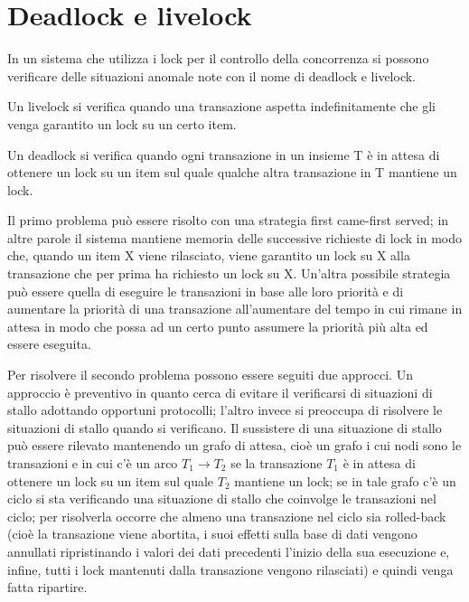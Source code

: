 \section{Deadlock e livelock}
In un sistema che utilizza i lock per il controllo della concorrenza si possono verificare delle situazioni anomale note con il nome di deadlock e livelock.

Un livelock si verifica quando una transazione aspetta indefinitamente che gli venga garantito un lock su un certo item. 

Un deadlock si verifica quando ogni transazione in un insieme T è in attesa di ottenere un lock su un item sul quale qualche altra transazione in T mantiene un lock. 

Il primo problema può essere risolto con una strategia first came-first served; in altre parole il sistema mantiene memoria delle successive richieste di lock in modo che, quando un item X viene rilasciato, viene garantito un lock su X alla transazione che per prima ha richiesto un lock su X. Un'altra possibile strategia può essere quella di eseguire le transazioni in base alle loro priorità e di aumentare la priorità di una transazione all'aumentare del tempo in cui rimane in attesa in modo che possa ad un certo punto assumere la priorità più alta ed essere eseguita.

Per risolvere il secondo problema possono essere seguiti due approcci. Un approccio è preventivo in quanto cerca di evitare il verificarsi di situazioni di stallo adottando opportuni protocolli; l'altro invece si preoccupa di risolvere le situazioni di stallo quando si verificano. Il sussistere di una situazione di stallo può essere rilevato mantenendo un grafo di attesa, cioè un grafo i cui nodi sono le transazioni e in cui c'è un arco $T_1\to T_2$ se la transazione $T_1$ è in attesa di ottenere un lock su un item sul quale $T_2$ mantiene un lock; se in tale grafo c'è un ciclo si sta verificando una situazione di stallo che coinvolge le transazioni nel ciclo; per risolverla occorre che almeno una transazione nel ciclo sia rolled-back (cioè la transazione viene abortita, i suoi effetti sulla base di dati vengono annullati ripristinando i valori dei dati precedenti l'inizio della sua esecuzione e, infine, tutti i lock mantenuti dalla transazione vengono rilasciati) e quindi venga fatta ripartire.

